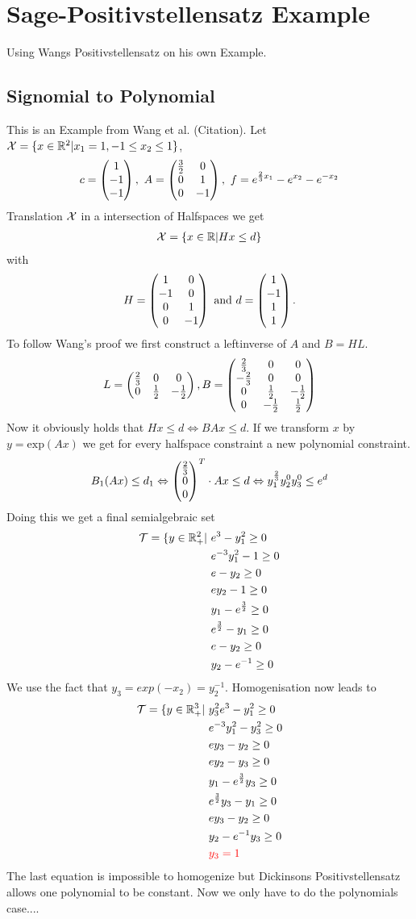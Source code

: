 \documentclass[./main.tex]{subfiles}
\begin{document}
\section{Sage-Positivstellensatz Example}
Using Wangs Positivstellensatz on his own Example.
\subsection{Signomial to Polynomial}
This is an Example from Wang et al. (Citation). Let $\mathcal X = \lbrace x \in \mathbb{R}^2 | x_1 = 1, -1\leq x_2 \leq 1 \rbrace$, 
\begin{equation*}
c = \begin{pmatrix}1\\-1\\-1\end{pmatrix}, \ A =  \begin{pmatrix} \frac 3 2 & 0 \\ 0 & 1 \\ 0 & -1 \end{pmatrix}, \ f=e^{\frac 2 3 x_1} - e^{x_2} - e^{-x_2}
\end{equation*}
Translation $\mathcal{X}$ in a intersection of Halfspaces we get
\begin{align*}
\mathcal{X} = \lbrace x \in \mathbb{R} \vert Hx \leq d \rbrace
\end{align*}
with
\begin{align*}
H =  \begin{pmatrix} 1 & 0 \\ -1 & 0 \\ 0 & 1 \\ 0 & -1 \end{pmatrix} \text{ and } d = \begin{pmatrix}1\\-1\\1\\1\end{pmatrix}.
\end{align*}
To follow Wang's proof we first construct a leftinverse of $A$ and $B=HL$.
\begin{align*}
L = \begin{pmatrix} \frac 2 3 & 0 & 0 \\ 0 & \frac 1 2 & -\frac 1 2 \\ \end{pmatrix}, B = \begin{pmatrix} \frac 2 3 & 0 & 0 \\ -\frac 2 3 & 0 & 0 \\ 0 & \frac 1 2 & -\frac 1 2 \\ 0 & -\frac 1 2 & \frac 1 2 \\ \end{pmatrix}
\end{align*}
Now it obviously holds that $Hx \leq d  \Leftrightarrow BAx \leq d$. If we transform $x$ by $y=\text{exp}(Ax)$ we get for every halfspace constraint a new polynomial constraint.
\begin{align*}
B_1(Ax) \leq d_1 \Leftrightarrow  \begin{pmatrix}\frac 2 3\\0\\0\end{pmatrix}^T  \cdot Ax \leq d \Leftrightarrow y_1^{\frac 2 3}y_2^0y_3^0 \leq e^d
\end{align*}
Doing this we get a final semialgebraic set
\begin{align*}
\mathcal{T} = \lbrace y \in \mathbb{R}^2_+ \vert \ & e^3 - y_1^2 \geq 0 \\
& e^{-3}y_1^2 -1 \geq 0 \\
& e - y_2 \geq 0\\
& ey_2 - 1 \geq 0 \\
& y_1 - e^{\frac 3 2} \geq 0 \\
& e^{\frac 3 2} - y_1 \geq 0 \\
&e- y_2 \geq 0 \\
&y_2 -e^{-1}  \geq 0
\end{align*}
We use the fact that $y_3 = exp(-x_2) = y_2^{-1}.$ Homogenisation now leads to
\begin{align*}
\mathcal{T} = \lbrace y \in \mathbb{R}^3_+ \vert \ & y_3^2e^3 - y_1^2 \geq 0 \\
& e^{-3}y_1^2 -y_3^2 \geq 0 \\
& ey_3 - y_2 \geq 0\\
& ey_2 - y_3 \geq 0 \\
& y_1 - e^{\frac 3 2}y_3 \geq 0 \\
& e^{\frac 3 2}y_3 - y_1 \geq 0 \\
&ey_3- y_2 \geq 0 \\
&y_2 -e^{-1}y_3  \geq 0 \\
&\textcolor{red}{y_3 =  1}
\end{align*}
The last equation is impossible to homogenize but Dickinsons Positivstellensatz allows one polynomial to be constant. Now we only have to do the polynomials case....
\end{document}
